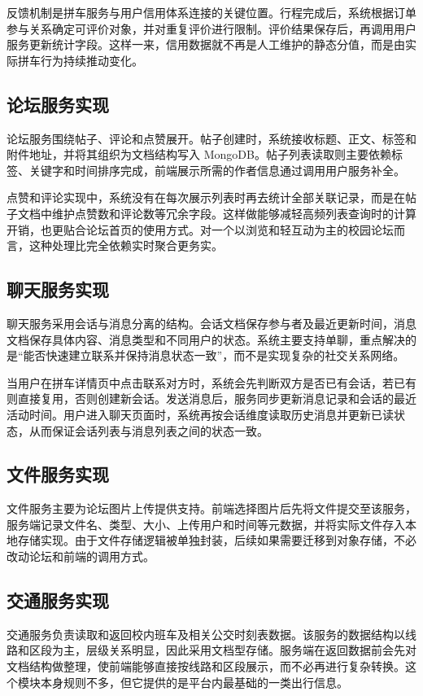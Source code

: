 反馈机制是拼车服务与用户信用体系连接的关键位置。行程完成后，系统根据订单参与关系确定可评价对象，并对重复评价进行限制。评价结果保存后，再调用用户服务更新统计字段。这样一来，信用数据就不再是人工维护的静态分值，而是由实际拼车行为持续推动变化。


\subsection{论坛服务实现}

论坛服务围绕帖子、评论和点赞展开。帖子创建时，系统接收标题、正文、标签和附件地址，并将其组织为文档结构写入 MongoDB。帖子列表读取则主要依赖标签、关键字和时间排序完成，前端展示所需的作者信息通过调用用户服务补全。

点赞和评论实现中，系统没有在每次展示列表时再去统计全部关联记录，而是在帖子文档中维护点赞数和评论数等冗余字段。这样做能够减轻高频列表查询时的计算开销，也更贴合论坛首页的使用方式。对一个以浏览和轻互动为主的校园论坛而言，这种处理比完全依赖实时聚合更务实。

\subsection{聊天服务实现}

聊天服务采用会话与消息分离的结构。会话文档保存参与者及最近更新时间，消息文档保存具体内容、消息类型和不同用户的状态。系统主要支持单聊，重点解决的是“能否快速建立联系并保持消息状态一致”，而不是实现复杂的社交关系网络。

当用户在拼车详情页中点击联系对方时，系统会先判断双方是否已有会话，若已有则直接复用，否则创建新会话。发送消息后，服务同步更新消息记录和会话的最近活动时间。用户进入聊天页面时，系统再按会话维度读取历史消息并更新已读状态，从而保证会话列表与消息列表之间的状态一致。

\subsection{文件服务实现}

文件服务主要为论坛图片上传提供支持。前端选择图片后先将文件提交至该服务，服务端记录文件名、类型、大小、上传用户和时间等元数据，并将实际文件存入本地存储实现。由于文件存储逻辑被单独封装，后续如果需要迁移到对象存储，不必改动论坛和前端的调用方式。

\subsection{交通服务实现}

交通服务负责读取和返回校内班车及相关公交时刻表数据。该服务的数据结构以线路和区段为主，层级关系明显，因此采用文档型存储。服务端在返回数据前会先对文档结构做整理，使前端能够直接按线路和区段展示，而不必再进行复杂转换。这个模块本身规则不多，但它提供的是平台内最基础的一类出行信息。

